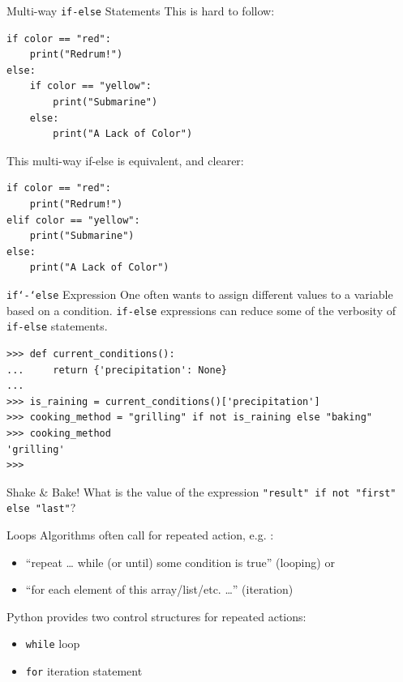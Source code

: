 \documentclass[smaller, aspectratio=1610]{beamer}
\begin{document}
\begin{frame}[label={sec:org2bb1a52},fragile]{Multi-way \texttt{if-else} Statements}
 This is hard to follow:

\lstset{language=Python,label= ,caption= ,captionpos=b,numbers=none}
\begin{lstlisting}
if color == "red":
    print("Redrum!")
else:
    if color == "yellow":
        print("Submarine")
    else:
        print("A Lack of Color")
\end{lstlisting}

This multi-way if-else is equivalent, and clearer:

\lstset{language=Python,label= ,caption= ,captionpos=b,numbers=none}
\begin{lstlisting}
if color == "red":
    print("Redrum!")
elif color == "yellow":
    print("Submarine")
else:
    print("A Lack of Color")
\end{lstlisting}
\end{frame}

\begin{frame}[label={sec:orgafbeeb3},fragile]{\texttt{if`-`else} Expression}
 One often wants to assign different values to a variable based on a condition.  \texttt{if-else} expressions can reduce some of the verbosity of \texttt{if-else} statements.

\lstset{language=Python,label= ,caption= ,captionpos=b,numbers=none}
\begin{lstlisting}
>>> def current_conditions():
...     return {'precipitation': None}
...
>>> is_raining = current_conditions()['precipitation']
>>> cooking_method = "grilling" if not is_raining else "baking"
>>> cooking_method
'grilling'
>>>
\end{lstlisting}
\end{frame}

\begin{frame}[label={sec:orgcaeed51},fragile]{Shake \& Bake!}
 What is the value of the expression \texttt{"result" if not "first" else "last"}?
\end{frame}

\begin{frame}[label={sec:orgc64b50e},fragile]{Loops}
 Algorithms often call for repeated action, e.g. :

\begin{itemize}
\item “repeat \ldots{} while (or until) some condition is true” (looping) or
\item “for each element of this array/list/etc. \ldots{}” (iteration)
\end{itemize}

Python provides two control structures for repeated actions:

\begin{itemize}
\item \texttt{while} loop
\item \texttt{for} iteration statement
\end{itemize}
\end{frame}
\end{document}
